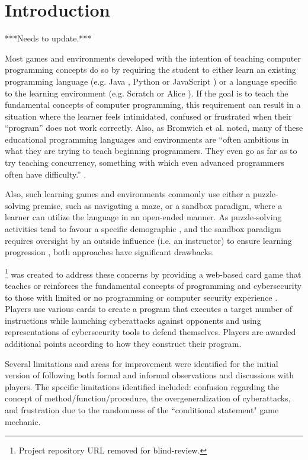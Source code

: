 \section{Introduction}

***Needs to update.***

Most games and environments developed with the intention of teaching computer programming concepts do so by requiring the student to either learn an existing programming language (e.g. Java \cite{Robocode}, Python \cite{CodeWars,CheckIO} or JavaScript \cite{CodeCombat,CheckIO,Codingame}) or a language specific to the learning environment (e.g. Scratch \cite{Scratch} or Alice \cite{Alice}). If the goal is to teach the fundamental concepts of computer programming, this requirement can result in a situation where the learner feels intimidated, confused or frustrated when their ``program'' does not work correctly. Also, as Bromwich et al. noted, many of these educational programming languages and environments are ``often ambitious in what they are trying to teach beginning programmers. They even go as far as to try teaching concurrency, something with which even advanced programmers often have difficulty.'' \cite{Bromwich2012}.

Also, such learning games and environments commonly use either a puzzle-solving premise, such as navigating a maze, or a sandbox paradigm, where a learner can utilize the language in an open-ended manner. As puzzle-solving activities tend to favour a specific demographic \cite{Phan2012}, and the sandbox paradigm requires oversight by an outside influence (i.e. an instructor) to ensure learning progression \cite{Bromwich2012}, both approaches have significant drawbacks.    

\gameNameNS
\footnote{Project repository URL removed for blind-review.} 
was created to address these concerns by providing a web-based card game that teaches or reinforces the fundamental concepts of programming and cybersecurity to those with limited or no programming or computer security experience \cite{anvikPW}. Players use various cards to create a program that executes a target number of instructions while launching cyberattacks against opponents and using representations of cybersecurity tools to defend themselves. Players are awarded additional points according to how they construct their program.

Several limitations and areas for improvement were identified for the initial version of \gameName following both formal \cite{anvikPW} and informal observations and discussions with players. The specific limitations identified included: confusion regarding the concept of method/function/procedure, the overgeneralization of cyberattacks, and frustration due to the randomness of the ``conditional statement" game mechanic.

